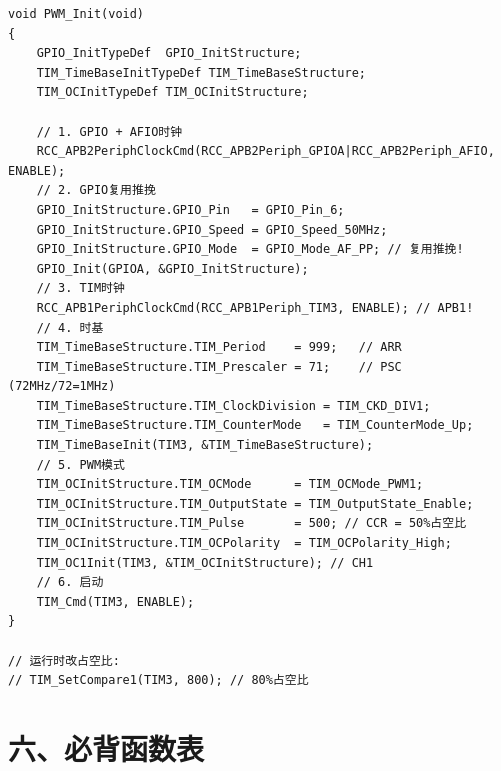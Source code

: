 \documentclass[10pt,a4paper,oneside]{ctexart}
\begin{document}
\begin{codebox}
\begin{lstlisting}[style=stm32, numbers=none]
void PWM_Init(void)
{
    GPIO_InitTypeDef  GPIO_InitStructure;
    TIM_TimeBaseInitTypeDef TIM_TimeBaseStructure;
    TIM_OCInitTypeDef TIM_OCInitStructure;

    // 1. GPIO + AFIO时钟
    RCC_APB2PeriphClockCmd(RCC_APB2Periph_GPIOA|RCC_APB2Periph_AFIO, ENABLE);
    // 2. GPIO复用推挽
    GPIO_InitStructure.GPIO_Pin   = GPIO_Pin_6;
    GPIO_InitStructure.GPIO_Speed = GPIO_Speed_50MHz;
    GPIO_InitStructure.GPIO_Mode  = GPIO_Mode_AF_PP; // 复用推挽!
    GPIO_Init(GPIOA, &GPIO_InitStructure);
    // 3. TIM时钟
    RCC_APB1PeriphClockCmd(RCC_APB1Periph_TIM3, ENABLE); // APB1!
    // 4. 时基
    TIM_TimeBaseStructure.TIM_Period    = 999;   // ARR
    TIM_TimeBaseStructure.TIM_Prescaler = 71;    // PSC (72MHz/72=1MHz)
    TIM_TimeBaseStructure.TIM_ClockDivision = TIM_CKD_DIV1;
    TIM_TimeBaseStructure.TIM_CounterMode   = TIM_CounterMode_Up;
    TIM_TimeBaseInit(TIM3, &TIM_TimeBaseStructure);
    // 5. PWM模式
    TIM_OCInitStructure.TIM_OCMode      = TIM_OCMode_PWM1;
    TIM_OCInitStructure.TIM_OutputState = TIM_OutputState_Enable;
    TIM_OCInitStructure.TIM_Pulse       = 500; // CCR = 50%占空比
    TIM_OCInitStructure.TIM_OCPolarity  = TIM_OCPolarity_High;
    TIM_OC1Init(TIM3, &TIM_OCInitStructure); // CH1
    // 6. 启动
    TIM_Cmd(TIM3, ENABLE);
}

// 运行时改占空比:
// TIM_SetCompare1(TIM3, 800); // 80%占空比
\end{lstlisting}
\end{codebox}

\section*{六、必背函数表}
\end{document}

